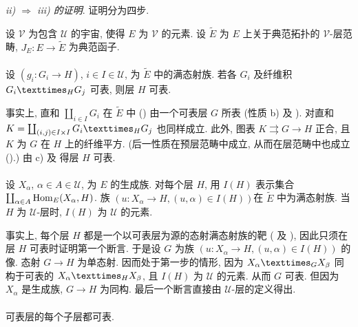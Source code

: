 \subsubsection{}
\emph{ii) $\Rightarrow$ iii) 的证明}. 证明分为四步.

设 $𝒱$ 为包含 $𝒰$ 的宇宙, 使得 $E$ 为 $𝒱$ 的元素. 设 $\widetilde{E}$ 为 $E$ 上关于典范拓扑的 $𝒱$-层范畴, $J_E:E\rightarrow \widetilde{E}$ 为典范函子.

\paragraph{}
设 $(g_i:G_i\rightarrow H)$, $i\in I\in 𝒰$, 为 $\widetilde{E}$ 中的满态射族. 若各 $G_i$ 及纤维积 $\fprod{G_i}{G_j}{H}$ 可表, 则层 $H$ 可表.

事实上, 直和 $\coprod_{i\in I}G_i$ 在 $\widetilde{E}$ 中 () 由一个可表层 $G$ 所表 (性质 b) 及 ). 对直和 $K=\coprod_{(i,j)\in I\times I}\fprod{G_i}{G_j}{H}$ 也同样成立. 此外, 图表 $K\rightrightarrows G\rightarrow H$ 正合, 且 $K$ 为 $G$ 在 $H$ 上的纤维平方. (后一性质在预层范畴中成立, 从而在层范畴中也成立 ().) 由 c) 及  得层 $H$ 可表.

\paragraph{}
设 $X_{\alpha}$, $\alpha\in A\in 𝒰$, 为 $E$ 的生成族. 对每个层 $H$, 用 $I(H)$ 表示集合 $\coprod_{\alpha \in A}\operatorname{Hom}_E (X_{\alpha}, H)$. 族 $(u:X_{\alpha}\rightarrow H, (u,\alpha)\in I(H))$\pageoriginale 在 $\widetilde{E}$ 中为满态射族. 当 $H$ 为 $𝒰$-层时, $I(H)$ 为 $𝒰$ 的元素.

事实上, 每个层 $H$ 都是一个以可表层为源的态射满态射族的靶 ( 及 ), 因此只须在层 $H$ 可表时证明第一个断言. 于是设 $G$ 为族 $(u:X_{\alpha}\rightarrow H, (u,\alpha)\in I(H))$ 的像. 态射 $G\rightarrow H$ 为单态射. 因而处于第一步的情形, 因为 $\fprod{X_{\alpha}}{X_{\beta}}{G}$ 同构于可表的 $\fprod{X_{\alpha}}{X_{\beta}}{H}$, 且 $I(H)$ 为 $𝒰$ 的元素. 从而 $G$ 可表. 但因为 $X_{\alpha}$ 是生成族, $G\rightarrow H$ 为同构. 最后一个断言直接由 $𝒰$-层的定义得出.

\paragraph{}
可表层的每个子层都可表.

